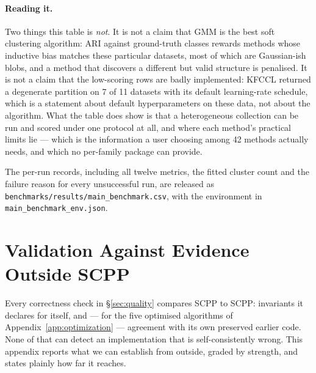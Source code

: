 \documentclass[twoside,11pt]{article}
\begin{document}
\paragraph{Reading it.} Two things this table is \emph{not}. It is not a
claim that GMM is the best soft clustering algorithm: ARI against
ground-truth classes rewards methods whose inductive bias matches these
particular datasets, most of which are Gaussian-ish blobs, and a method that
discovers a different but valid structure is penalised. It is not a claim
that the low-scoring rows are badly implemented: KFCCL returned a degenerate
partition on 7 of 11 datasets with its default learning-rate schedule, which
is a statement about default hyperparameters on these data, not about the
algorithm. What the table does show is that a heterogeneous collection can be
run and scored under one protocol at all, and where each method's practical
limits lie --- which is the information a user choosing among 42 methods
actually needs, and which no per-family package can provide.

The per-run records, including all twelve metrics, the fitted cluster count
and the failure reason for every unsuccessful run, are released as
\texttt{benchmarks/results/main\_benchmark.csv}, with the environment in
\texttt{main\_benchmark\_env.json}.

\section{Validation Against Evidence Outside SCPP}\label{app:external}

Every correctness check in \S\ref{sec:quality} compares SCPP to SCPP:
invariants it declares for itself, and --- for the five optimised algorithms
of Appendix~\ref{app:optimization} --- agreement with its own preserved
earlier code. None of that can detect an implementation that is
self-consistently wrong. This appendix reports what we can establish from
outside, graded by strength, and states plainly how far it reaches.
\end{document}

